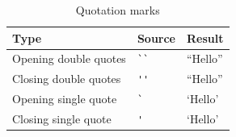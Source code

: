 \begin{table}[H]
\centering
\begin{tabular}{lll}
\toprule
\textbf{Type} & \textbf{Source} & \textbf{Result} \\
\midrule
Opening double quotes & \verb|``| & ``Hello'' \\
Closing double quotes & \verb|''| & ``Hello'' \\
Opening single quote  & \verb|`|  & `Hello' \\
Closing single quote  & \verb|'|  & `Hello' \\
\bottomrule
\end{tabular}
\caption{Quotation marks}
\end{table}

